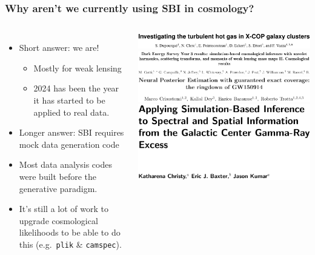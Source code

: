 \documentclass[aspectratio=169]{beamer}
\begin{document}
\begin{frame}
    \frametitle{Why aren't we currently using SBI in cosmology?}
    \begin{columns}
        \begin{itemize}
            \item Short answer: we are!
                \begin{itemize}
                    \item Mostly for weak lensing
                    \item 2024 has been the year it has started to be applied to real data.
                \end{itemize}
            \item Longer answer: SBI requires mock data generation code
            \item Most data analysis codes were built before the generative paradigm.
            \item It's still a lot of work to upgrade cosmological likelihoods  to be able to do this (e.g.\ \texttt{plik} \& \texttt{camspec}).
        \end{itemize}
        \includegraphics[width=\textwidth]{figures/sbi_papers/clusters.pdf}
        \vspace{10pt}\\
        \includegraphics[width=\textwidth]{figures/sbi_papers/des.pdf}
        \vspace{10pt}\\
        \includegraphics[width=\textwidth]{figures/sbi_papers/gw.pdf}
        \vspace{10pt}\\
        \includegraphics[width=\textwidth]{figures/sbi_papers/center.pdf}

\end{columns}
\end{frame}
\end{document}
